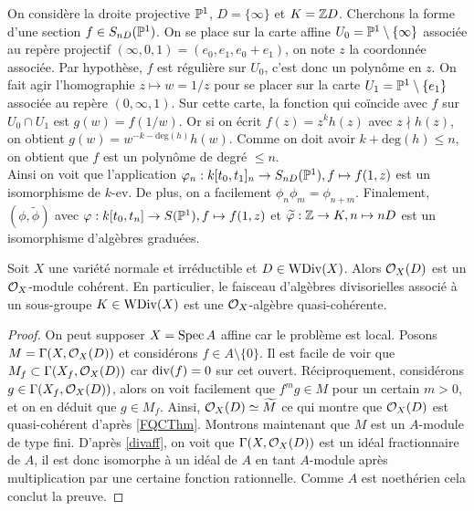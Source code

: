 \begin{ex}
On considère la droite projective $\mathbb{P}^1$, $D=\lbrace\infty\rbrace$ et $K=\mathbb{Z} D$. Cherchons la forme d'une section $f\in S_{nD}(\mathbb{P}^1)$. On se place sur la carte affine $U_0=\mathbb{P}^1\setminus \lbrace \infty\rbrace$ associée au repère projectif $(\infty, 0, 1)=(e_0,e_1,e_0+e_1)$, on note $z$ la coordonnée associée. Par hypothèse, $f$ est régulière sur $U_0$, c'est donc un polynôme en $z$. On fait agir l'homographie $z\mapsto w=1/z$  pour se placer sur la carte $U_1=\mathbb{P}^1\setminus \lbrace e_1 \rbrace$ associée au repère $(0, \infty,1)$. Sur cette carte, la fonction qui coïncide avec $f$ sur $U_0\cap U_1$ est $g(w)=f(1/w)$. Or si on écrit $f(z)=z^kh(z)$ avec $z\nmid h(z)$, on obtient $g(w)=w^{-k-\textrm{deg}(h)}h(w)$. Comme on doit avoir $k+\textrm{deg}(h)\leq n$, on obtient que $f$ est un polynôme de degré $\leq n$.\\
Ainsi on voit que l'application $\varphi_n:k[t_0,t_1]_n\rightarrow S_{nD}(\mathbb{P}^1), f\mapsto f(1,z)$ est un isomorphisme de $k$-ev. De plus, on a facilement $\phi_n\phi_m=\phi_{n+m}$. Finalement, $(\phi, \widetilde{\phi})$ avec $\varphi: k[t_0,t_n]\rightarrow S(\mathbb{P}^1), f\mapsto f(1,z)$ et $\widetilde{\varphi}:\mathbb{Z}\rightarrow K, n\mapsto nD$ est un isomorphisme d'algèbres graduées.
\end{ex}

\begin{prop}
Soit $X$ une variété normale et irréductible et $D\in\operatorname{WDiv}(X)$. Alors $\mathcal{O}_X(D)$ est un $\mathcal{O}_X$-module cohérent. En particulier, le faisceau d'algèbres divisorielles associé à un sous-groupe $K\in \operatorname{WDiv}(X)$ est une $\mathcal{O}_X$-algèbre quasi-cohérente.
\end{prop}
\begin{proof}
On peut supposer $X=\operatorname{Spec} A$ affine car le problème est local. Posons $M=\Gamma(X, \mathcal{O}_X(D))$ et considérons $f\in A\setminus\lbrace 0\rbrace$. Il est facile de voir que $M_f\subset \Gamma(X_f,\mathcal{O}_X(D))$ car $\operatorname{div}(f)=0$ sur cet ouvert. Réciproquement, considérons $g\in \Gamma(X_f,\mathcal{O}_X(D))$, alors on voit facilement que $f^mg\in M$ pour un certain $m>0$, et on en déduit que $g\in M_f$. Ainsi, $\mathcal{O}_X(D)\simeq \widetilde{M}$ ce qui montre que $\mathcal{O}_X(D)$ est quasi-cohérent d'après \ref{FQCThm}. Montrons maintenant que $M$ est un $A$-module de type fini. D'après \ref{divaff}, on voit que $\Gamma(X,\mathcal{O}_X(D))$ est un idéal fractionnaire de $A$, il est donc isomorphe à un idéal de $A$ en tant $A$-module après multiplication par une certaine fonction rationnelle. Comme $A$ est noethérien cela conclut la preuve.
\end{proof}

